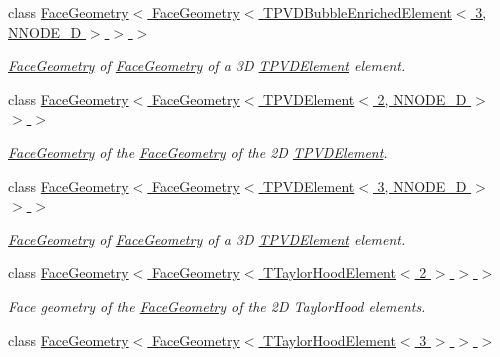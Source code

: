 \begin{DoxyCompactItemize}
class \hyperlink{classoomph_1_1FaceGeometry_3_01FaceGeometry_3_01TPVDBubbleEnrichedElement_3_013_00_01NNODE__1D_01_4_01_4_01_4}{Face\+Geometry$<$ Face\+Geometry$<$ T\+P\+V\+D\+Bubble\+Enriched\+Element$<$ 3, N\+N\+O\+D\+E\+\_\+D $>$ $>$ $>$}
\begin{DoxyCompactList}\small\item\em \hyperlink{classoomph_1_1FaceGeometry}{Face\+Geometry} of \hyperlink{classoomph_1_1FaceGeometry}{Face\+Geometry} of a 3D \hyperlink{classoomph_1_1TPVDElement}{T\+P\+V\+D\+Element} element. \end{DoxyCompactList}\item 
class \hyperlink{classoomph_1_1FaceGeometry_3_01FaceGeometry_3_01TPVDElement_3_012_00_01NNODE__1D_01_4_01_4_01_4}{Face\+Geometry$<$ Face\+Geometry$<$ T\+P\+V\+D\+Element$<$ 2, N\+N\+O\+D\+E\+\_\+D $>$ $>$ $>$}
\begin{DoxyCompactList}\small\item\em \hyperlink{classoomph_1_1FaceGeometry}{Face\+Geometry} of the \hyperlink{classoomph_1_1FaceGeometry}{Face\+Geometry} of the 2D \hyperlink{classoomph_1_1TPVDElement}{T\+P\+V\+D\+Element}. \end{DoxyCompactList}\item 
class \hyperlink{classoomph_1_1FaceGeometry_3_01FaceGeometry_3_01TPVDElement_3_013_00_01NNODE__1D_01_4_01_4_01_4}{Face\+Geometry$<$ Face\+Geometry$<$ T\+P\+V\+D\+Element$<$ 3, N\+N\+O\+D\+E\+\_\+D $>$ $>$ $>$}
\begin{DoxyCompactList}\small\item\em \hyperlink{classoomph_1_1FaceGeometry}{Face\+Geometry} of \hyperlink{classoomph_1_1FaceGeometry}{Face\+Geometry} of a 3D \hyperlink{classoomph_1_1TPVDElement}{T\+P\+V\+D\+Element} element. \end{DoxyCompactList}\item 
class \hyperlink{classoomph_1_1FaceGeometry_3_01FaceGeometry_3_01TTaylorHoodElement_3_012_01_4_01_4_01_4}{Face\+Geometry$<$ Face\+Geometry$<$ T\+Taylor\+Hood\+Element$<$ 2 $>$ $>$ $>$}
\begin{DoxyCompactList}\small\item\em Face geometry of the \hyperlink{classoomph_1_1FaceGeometry}{Face\+Geometry} of the 2D Taylor\+Hood elements. \end{DoxyCompactList}\item 
class \hyperlink{classoomph_1_1FaceGeometry_3_01FaceGeometry_3_01TTaylorHoodElement_3_013_01_4_01_4_01_4}{Face\+Geometry$<$ Face\+Geometry$<$ T\+Taylor\+Hood\+Element$<$ 3 $>$ $>$ $>$}

\end{DoxyCompactItemize}
